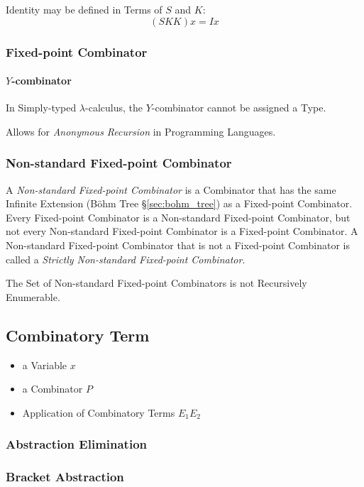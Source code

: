 Identity may be defined in Terms of $S$ and $K$:
\[
  (S K K) x = I x
\]



\subsubsection{Fixed-point Combinator}\label{sec:fixedpoint_combinator}

\paragraph{$Y$-combinator}\label{sec:y_combinator}

In Simply-typed $\lambda$-calculus, the $Y$-combinator cannot be
assigned a Type.

Allows for \emph{Anonymous Recursion} in Programming Languages.



\subsubsection{Non-standard Fixed-point Combinator}
\label{sec:nonstandard_combinator}

A \emph{Non-standard Fixed-point Combinator} is a Combinator that has
the same Infinite Extension (B\"ohm Tree \S\ref{sec:bohm_tree}) as a
Fixed-point Combinator. Every Fixed-point Combinator is a Non-standard
Fixed-point Combinator, but not every Non-standard Fixed-point
Combinator is a Fixed-point Combinator. A Non-standard Fixed-point
Combinator that is not a Fixed-point Combinator is called a
\emph{Strictly Non-standard Fixed-point Combinator}.

The Set of Non-standard Fixed-point Combinators is not Recursively
Enumerable. \cite{goldberg05}



\subsection{Combinatory Term}\label{sec:combinatory_term}

\begin{itemize}
  \item a Variable $x$
  \item a Combinator $P$
  \item Application of Combinatory Terms $E_1 E_2$
\end{itemize}



\subsubsection{Abstraction Elimination}
\label{sec:abstraction_elimination}

\subsubsection{Bracket Abstraction}\label{sec:bracket_abstraction}
